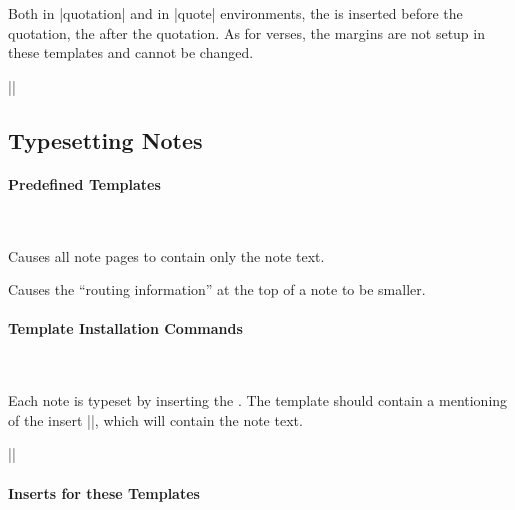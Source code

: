 \begin{command}{\usetemplatequotation{}}
  Both in |quotation| and in |quote| environments, the  is inserted before the quotation, the
   after the quotation. As for verses, the
  margins are not setup in these templates and cannot be changed.
  
  \example |\usetemplatequotation{\itshape}{}|
\end{command}




\subsection{Typesetting Notes}

\label{section-note-templates}

\paragraph{Predefined Templates}\

\begin{command}{\beamertemplatenoteplain}
  Causes all note pages to contain only the note text.
\end{command}

\begin{command}{\beamertemplatenotecompress}
  Causes the ``routing information'' at the top of a note to be
  smaller. 
\end{command}


\paragraph{Template Installation Commands}\

\begin{command}{\usetemplatenote{}}
  Each note is typeset by inserting the . The
  template should contain a mentioning of the insert |\insertnote|,
  which will contain the note text.
  
  \example |\usetemplatenote{\tiny\insertnote}|
\end{command}



\paragraph{Inserts for these Templates}\

